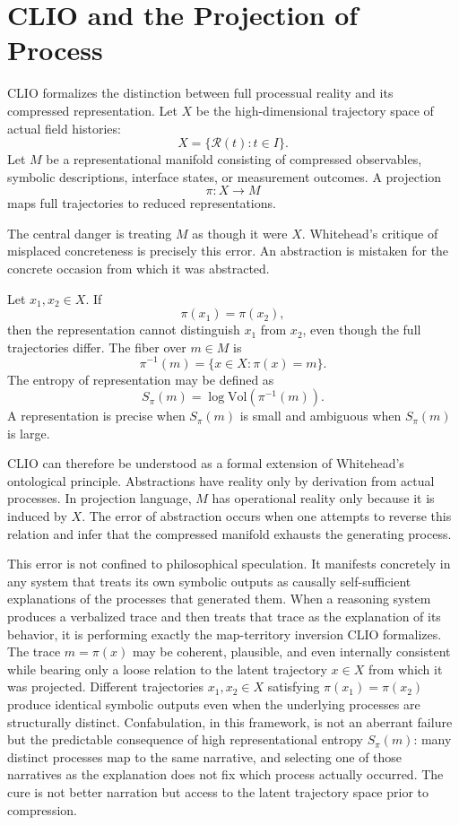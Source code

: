 \documentclass[12pt,a4paper]{article}
\begin{document}
\section{CLIO and the Projection of Process}

CLIO formalizes the distinction between full processual reality and its compressed representation. Let \(X\) be the high-dimensional trajectory space of actual field histories:
\[
X = \{\mathcal{R}(t) : t \in I\}.
\]
Let \(M\) be a representational manifold consisting of compressed observables, symbolic descriptions, interface states, or measurement outcomes. A projection
\[
\pi : X \to M
\]
maps full trajectories to reduced representations.

The central danger is treating \(M\) as though it were \(X\). Whitehead's critique of misplaced concreteness is precisely this error. An abstraction is mistaken for the concrete occasion from which it was abstracted.

Let \(x_1,x_2 \in X\). If
\[
\pi(x_1)=\pi(x_2),
\]
then the representation cannot distinguish \(x_1\) from \(x_2\), even though the full trajectories differ. The fiber over \(m \in M\) is
\[
\pi^{-1}(m)=\{x\in X:\pi(x)=m\}.
\]
The entropy of representation may be defined as
\[
S_\pi(m)=\log \mathrm{Vol}(\pi^{-1}(m)).
\]
A representation is precise when \(S_\pi(m)\) is small and ambiguous when \(S_\pi(m)\) is large.

CLIO can therefore be understood as a formal extension of Whitehead's ontological principle. Abstractions have reality only by derivation from actual processes. In projection language, \(M\) has operational reality only because it is induced by \(X\). The error of abstraction occurs when one attempts to reverse this relation and infer that the compressed manifold exhausts the generating process.

This error is not confined to philosophical speculation. It manifests concretely in any system that treats its own symbolic outputs as causally self-sufficient explanations of the processes that generated them. When a reasoning system produces a verbalized trace and then treats that trace as the explanation of its behavior, it is performing exactly the map-territory inversion CLIO formalizes. The trace \(m = \pi(x)\) may be coherent, plausible, and even internally consistent while bearing only a loose relation to the latent trajectory \(x \in X\) from which it was projected. Different trajectories \(x_1, x_2 \in X\) satisfying \(\pi(x_1) = \pi(x_2)\) produce identical symbolic outputs even when the underlying processes are structurally distinct. Confabulation, in this framework, is not an aberrant failure but the predictable consequence of high representational entropy \(S_\pi(m)\): many distinct processes map to the same narrative, and selecting one of those narratives as the explanation does not fix which process actually occurred. The cure is not better narration but access to the latent trajectory space prior to compression.
\end{document}
